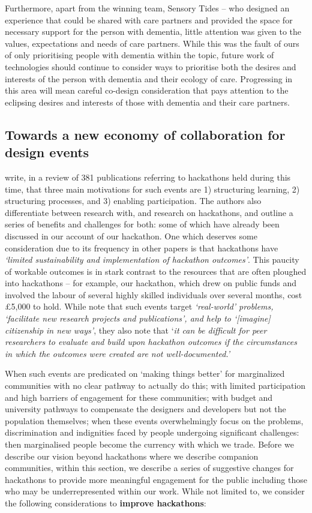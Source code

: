 Furthermore, apart from the winning team, Sensory Tides – who designed an experience that could be shared with care partners and provided the space for necessary support for the person with dementia, little attention was given to the values, expectations and needs of care partners. While this was the fault of ours of only prioritising people with dementia within the topic, future work of technologies should continue to consider ways to prioritise both the desires and interests of the person with dementia and their ecology of care. Progressing in this area will mean careful co-design consideration that pays attention to the eclipsing desires and interests of those with dementia and their care partners.

\subsection{Towards a new economy of collaboration for design events}
\label{newEconomy}
\cite{falk_olesen_10_2020} write, in a review of 381 publications referring to hackathons held during this time, that three main motivations for such events are 1) structuring learning, 2) structuring processes, and 3) enabling participation. The authors also differentiate between research with, and research on hackathons, and outline a series of benefits and challenges for both: some of which have already been discussed in our account of our hackathon. One which deserves some consideration due to its frequency in other papers \citep{birbeck_self_2017,johnson_civic_2014} is that hackathons have\textit{ ‘limited sustainability and implementation of hackathon outcomes’}. This paucity of workable outcomes is in stark contrast to the resources that are often ploughed into hackathons – for example, our hackathon, which drew on public funds and involved the labour of several highly skilled individuals over several months, cost £5,000 to hold. While \cite{falk_olesen_10_2020} note that such events target \textit{‘real-world’ problems, ‘facilitate new research projects and publications’, and help to ‘[imagine] citizenship in new ways’}, they also note that ‘\textit{it can be difficult for peer researchers to evaluate and build upon hackathon outcomes if the circumstances in which the outcomes were created are not well-documented.’}

When such events are predicated on ‘making things better’ for marginalized communities with no clear pathway to actually do this; with limited participation and high barriers of engagement for these communities; with budget and university pathways to compensate the designers and developers but not the population themselves; when these events overwhelmingly focus on the problems, discrimination and indignities faced by people undergoing significant challenges: then marginalised people become the currency with which we trade. Before we describe our vision beyond hackathons where we describe companion communities, within this section, we describe a series of suggestive changes for hackathons to provide more meaningful engagement for the public including those who may be underrepresented within our work. While not limited to, we consider the following considerations to \textbf{improve hackathons}:

